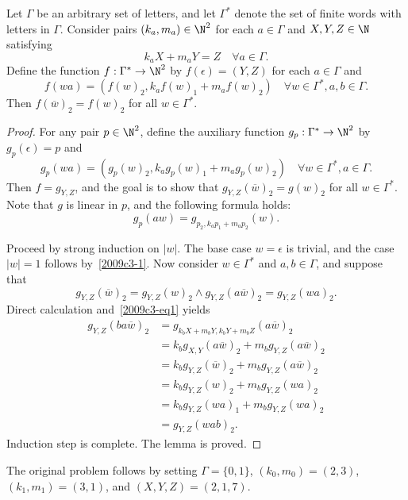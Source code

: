 \begin{lemma}\label{2009c3-1}
Let $\Gamma$ be an arbitrary set of letters, and let $\Gamma^*$ denote the set of finite words with letters in $\Gamma$.
Consider pairs $(k_a, m_a) \in \N^2$ for each $a \in \Gamma$ and $X, Y, Z \in \N$ satisfying
\[ k_a X + m_a Y = Z \quad \forall a \in \Gamma. \tag{1}\label{2009c3-eq1} \]
Define the function $f : \Gamma^* \to \N^2$ by $f(\epsilon) = (Y, Z)$ for each $a \in \Gamma$ and
\[ f(wa) = (f(w)_2, k_a f(w)_1 + m_a f(w)_2) \quad \forall w \in \Gamma^*, a, b \in \Gamma. \]
Then $f(\overline{w})_2 = f(w)_2$ for all $w \in \Gamma^*$.
\end{lemma}
\begin{proof}
For any pair $p \in \N^2$, define the auxiliary function $g_p : \Gamma^* \to \N^2$ by $g_p(\epsilon) = p$ and
\[ g_p(wa) = (g_p(w)_2, k_a g_p(w)_1 + m_a g_p(w)_2) \quad \forall w \in \Gamma^*, a \in \Gamma. \]
Then $f = g_{Y, Z}$, and the goal is to show that $g_{Y, Z}(\overline{w})_2 = g(w)_2$ for all $w \in \Gamma^*$.
Note that $g$ is linear in $p$, and the following formula holds:
\[ g_p(aw) = g_{p_2, k_a p_1 + m_a p_2}(w). \]

Proceed by strong induction on $|w|$.
The base case $w = \epsilon$ is trivial, and the case $|w| = 1$ follows by~\eqref{2009c3-1}.
Now consider $w \in \Gamma^*$ and $a, b \in \Gamma$, and suppose that
\[ g_{Y, Z}(\overline{w})_2 = g_{Y, Z}(w)_2 \wedge g_{Y, Z}(a \overline{w})_2 = g_{Y, Z}(wa)_2. \]
Direct calculation and~\eqref{2009c3-eq1} yields
\begin{align*}
    g_{Y, Z}(ba \overline{w})_2
    &= g_{k_b X + m_b Y, k_b Y + m_b Z}(a \overline{w})_2 \\
    &= k_b g_{X, Y}(a \overline{w})_2 + m_b g_{Y, Z}(a \overline{w})_2 \\
    &= k_b g_{Y, Z}(\overline{w})_2 + m_b g_{Y, Z}(a \overline{w})_2 \\
    &= k_b g_{Y, Z}(w)_2 + m_b g_{Y, Z}(wa)_2 \\
    &= k_b g_{Y, Z}(wa)_1 + m_b g_{Y, Z}(wa)_2 \\
    &= g_{Y, Z}(wab)_2.
\end{align*}
Induction step is complete.
The lemma is proved.
\end{proof}

The original problem follows by setting $\Gamma = \{0, 1\}$, $(k_0, m_0) = (2, 3)$, $(k_1, m_1) = (3, 1)$, and $(X, Y, Z) = (2, 1, 7)$.
